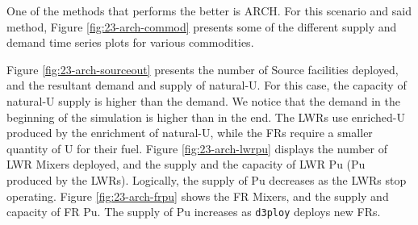 \documentclass[11pt,letterpaper]{article}
\newcommand{\deploy}{\texttt{d3ploy}\xspace}%
\begin{document}
One of the methods that performs the better is ARCH. For this scenario and said method, Figure \ref{fig:23-arch-commod} presents some of the different supply and demand time series plots for various commodities.

Figure \ref{fig:23-arch-sourceout} presents the number of Source facilities deployed, and the resultant demand and supply of natural-U. For this case, the capacity of natural-U supply is higher than the demand. We notice that the demand in the beginning of the simulation is higher than in the end. The LWRs use enriched-U produced by the enrichment of natural-U, while the FRs require a smaller quantity of U for their fuel. Figure \ref{fig:23-arch-lwrpu} displays the number of LWR Mixers deployed, and the supply and the capacity of LWR Pu (Pu produced by the LWRs). Logically, the supply of Pu decreases as the LWRs stop operating. Figure \ref{fig:23-arch-frpu} shows the FR Mixers, and the supply and capacity of FR Pu. The supply of Pu increases as \deploy deploys new FRs.
\end{document}
